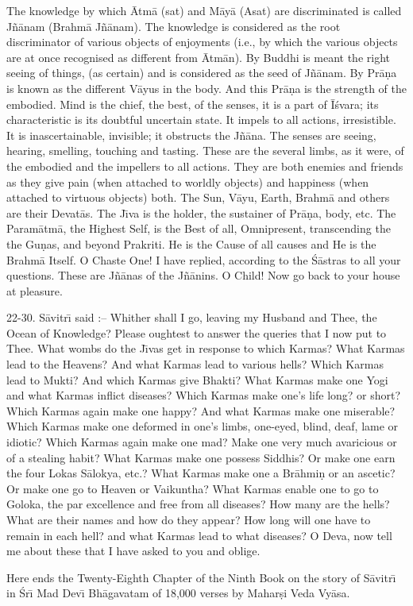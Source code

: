 The knowledge by which \=Atm\=a (sat) and M\=ay\=a (Asat) are discriminated is called J\~n\=anam (Brahm\=a J\~n\=anam). The knowledge is considered as the root discriminator of various objects of enjoyments (i.e., by which the various objects are at once recognised as different from \=Atm\=an). By Buddhi is meant the right seeing of things, (as certain) and is considered as the seed of J\~n\=anam. By Pr\=a\d{n}a is known as the different V\=ayus in the body. And this Pr\=a\d{n}a is the strength of the embodied. Mind is the chief, the best, of the senses, it is a part of \=I\'svara; its characteristic is its doubtful uncertain state. It impels to all actions, irresistible. It is inascertainable, invisible; it obstructs the J\~n\=ana. The senses are seeing, hearing, smelling, touching and tasting. These are the several limbs, as it were, of the embodied and the impellers to all actions. They are both enemies and friends as they give pain (when attached to worldly objects) and happiness (when attached to virtuous objects) both. The Sun, V\=ayu, Earth, Brahm\=a and others are their Devat\=as. The J\={\i}va is the holder, the sustainer of Pr\=a\d{n}a, body, etc. The Param\=atm\=a, the Highest Self, is the Best of all, Omnipresent, transcending the the Gu\d{n}as, and beyond Prakriti. He is the Cause of all causes and He is the Brahm\=a Itself. O Chaste One! I have replied, according to the \'S\=astras to all your questions. These are J\~n\=anas of the J\~n\=anins. O Child! Now go back to your house at pleasure.

22-30. S\=avitr\={\i} said :-- Whither shall I go, leaving my Husband and Thee, the Ocean of Knowledge? Please oughtest to answer the queries that I now put to Thee. What wombs do the J\={\i}vas get in response to which Karmas? What Karmas lead to the Heavens? And what Karmas lead to various hells? Which Karmas lead to Mukti? And which Karmas give Bhakti? What Karmas make one Yogi and what Karmas inflict diseases? Which Karmas make one's life long? or short? Which Karmas again make one happy? And what Karmas make one miserable? Which Karmas make one deformed in one's limbs, one-eyed, blind, deaf, lame or idiotic? Which Karmas again make one mad? Make one very much avaricious or of a stealing habit? What Karmas make one possess Siddhis? Or make one earn the four Lokas S\=alokya, etc.? What Karmas make one a Br\=ahmi\d{n} or an ascetic? Or make one go to Heaven or Vaikuntha? What Karmas enable one to go to Goloka, the par excellence and free from all diseases? How many are the hells? What are their names and how do they appear? How long will one have to remain in each hell? and what Karmas lead to what diseases? O Deva, now tell me about these that I have asked to you and oblige.

Here ends the Twenty-Eighth Chapter of the Ninth Book on the story of S\=avitr\={\i} in \'Sr\={\i} Mad Dev\={\i} Bh\=agavatam of 18,000 verses by Mahar\d{s}i Veda Vy\=asa.



